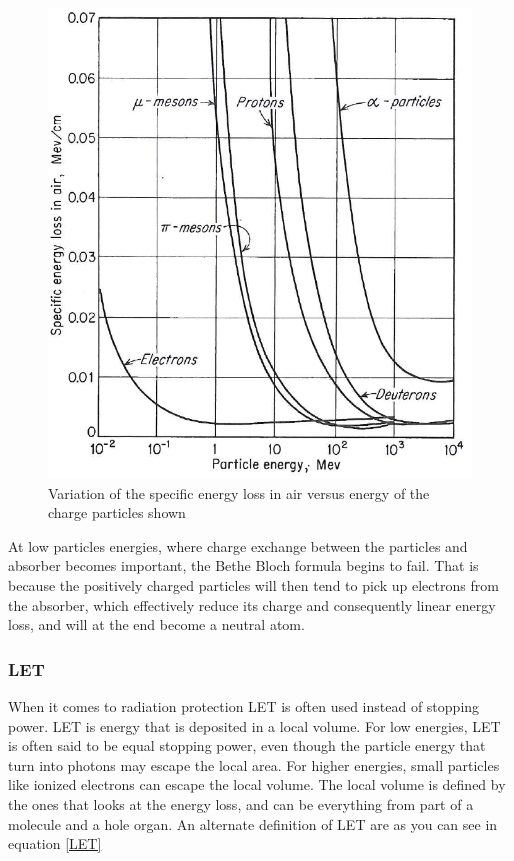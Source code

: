 \documentclass[12pt]{article}
\numberwithin{figure}{section}
\begin{document}
\begin{figure}[!htbp]
  \centering
  \includegraphics[width=\textwidth]{energy_loss.png}
  \caption{Variation of the specific energy loss in air versus energy of the charge particles shown}
  \label{energy_loss}
\end{figure}
\FloatBarrier
At low particles energies, where charge exchange between the particles and absorber becomes important, the Bethe Bloch formula begins to fail.
That is because the positively charged particles will then tend to pick up electrons from the absorber, which effectively reduce its charge and consequently linear energy loss, and will at the end become a neutral atom.

\subsubsection{\acf{LET}}
When it comes to radiation protection \acf{LET} is often used instead of stopping power. \ac{LET} is energy that is deposited in a local volume.
For low energies, \ac{LET} is often said to be equal stopping power, even though the particle energy that turn into photons may escape the local area.
For higher energies, small particles like ionized electrons can escape the local volume. The local volume is defined by the ones that looks at the energy loss, and can be everything from part of a molecule and a hole organ.
An alternate definition of LET are as you can see in equation \ref{LET}
\end{document}
